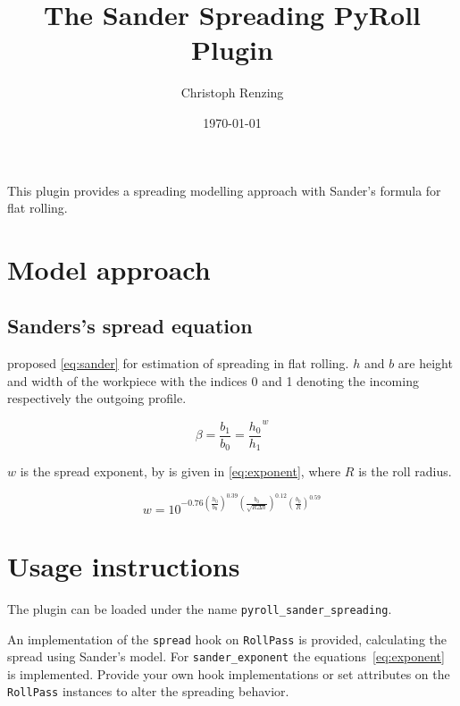 \documentclass[11pt]{PyRollDocs}
\begin{document}
    \title{The Sander Spreading PyRoll Plugin}
    \author{Christoph Renzing}
    \date{\today}

    \maketitle

    This plugin provides a spreading modelling approach with Sander's formula for flat rolling.


    \section{Model approach}\label{sec:model-approach}

    \subsection{Sanders's spread equation}\label{subsec:sander's-spread-equation}

    \textcite{Sander1978} proposed \autoref{eq:sander} for estimation of spreading in flat rolling.
    $h$ and $b$ are height and width of the workpiece with the indices 0 and 1 denoting the incoming respectively the outgoing profile.

    \begin{equation}
        \beta = \frac{b_1}{b_0} = \frac{h_0}{h_1} ^{w}
        \label{eq:sander}
    \end{equation}
    
    $w$ is the spread exponent, by \textcite{Sander1978} is given in \autoref{eq:exponent}, where $R$ is the roll radius.

    \begin{equation}
        w = 10^{ -0.76 \left( \frac{h_0}{b_0} \right)^{0.39} \left(\frac{b_0}{\sqrt{R \Delta h}} \right)^{0.12} \left( \frac{b_0}{R} \right)^{0.59} }
        \label{eq:exponent}
    \end{equation}


    \section{Usage instructions}\label{sec:usage-instructions}

    The plugin can be loaded under the name \texttt{pyroll\_sander\_spreading}.

    An implementation of the \lstinline{spread} hook on \lstinline{RollPass} is provided, calculating the spread using Sander's model.
    For \lstinline{sander_exponent} the equations~\ref{eq:exponent} is implemented.
    Provide your own hook implementations or set attributes on the \lstinline{RollPass} instances to alter the spreading behavior.

    \printbibliography
\end{document}
